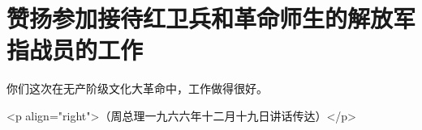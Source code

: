 \section[赞扬参加接待红卫兵和革命师生的解放军指战员的工作（一九六六年十二月）]{赞扬参加接待红卫兵和革命师生的解放军指战员的工作}


你们这次在无产阶级文化大革命中，工作做得很好。

<p align="right">（周总理一九六六年十二月十九日讲话传达）</p>


